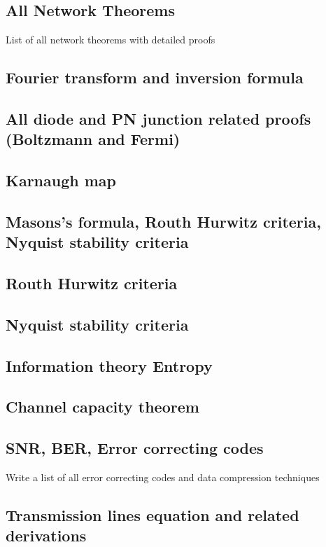 \documentclass[12pt]{article}
\begin{document}
\subsection{All Network Theorems}
List of all network theorems with detailed proofs

\subsection{Fourier transform and inversion formula}


\subsection{All diode and PN junction related proofs (Boltzmann and Fermi)}


\subsection{Karnaugh map}


\subsection{Masons's formula, Routh Hurwitz criteria, Nyquist stability criteria}


\subsection{Routh Hurwitz criteria}


\subsection{Nyquist stability criteria}


\subsection{Information theory Entropy}


\subsection{Channel capacity theorem}


\subsection{SNR, BER, Error correcting codes}
Write a list of all error correcting codes and data compression techniques

\subsection{Transmission lines equation and related derivations}


\printindex
\end{document}
